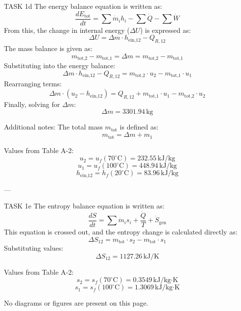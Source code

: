 TASK 1d  
The energy balance equation is written as:  
\[
\frac{dE_{\text{tot}}}{dt} = \sum \dot{m}_i h_i - \sum \dot{Q} - \sum \dot{W}
\]  
From this, the change in internal energy (\( \Delta U \)) is expressed as:  
\[
\Delta U = \Delta m \cdot h_{\text{ein,12}} - Q_{R,12}
\]  
The mass balance is given as:  
\[
m_{\text{tot,2}} - m_{\text{tot,1}} = \Delta m = m_{\text{tot,2}} - m_{\text{tot,1}}
\]  
Substituting into the energy balance:  
\[
\Delta m \cdot h_{\text{ein,12}} - Q_{R,12} = m_{\text{tot,2}} \cdot u_2 - m_{\text{tot,1}} \cdot u_1
\]  
Rearranging terms:  
\[
\Delta m \cdot (u_2 - h_{\text{ein,12}}) = Q_{R,12} + m_{\text{tot,1}} \cdot u_1 - m_{\text{tot,2}} \cdot u_2
\]  
Finally, solving for \( \Delta m \):  
\[
\Delta m = 3301.94 \, \text{kg}
\]  

Additional notes:  
The total mass \( m_{\text{tot}} \) is defined as:  
\[
m_{\text{tot}} = \Delta m + m_1
\]  

Values from Table A-2:  
\[
u_2 = u_f(70^\circ\text{C}) = 232.55 \, \text{kJ/kg}
\]  
\[
u_1 = u_f(100^\circ\text{C}) = 448.94 \, \text{kJ/kg}
\]  
\[
h_{\text{ein,12}} = h_f(20^\circ\text{C}) = 83.96 \, \text{kJ/kg}
\]  

---

TASK 1e  
The entropy balance equation is written as:  
\[
\frac{dS}{dt} = \sum \dot{m}_i s_i + \frac{\dot{Q}}{T} + \dot{S}_{\text{gen}}
\]  
This equation is crossed out, and the entropy change is calculated directly as:  
\[
\Delta S_{12} = m_{\text{tot}} \cdot s_2 - m_{\text{tot}} \cdot s_1
\]  
Substituting values:  
\[
\Delta S_{12} = 1127.26 \, \text{kJ/K}
\]  

Values from Table A-2:  
\[
s_2 = s_f(70^\circ\text{C}) = 0.3549 \, \text{kJ/kg·K}
\]  
\[
s_1 = s_f(100^\circ\text{C}) = 1.3069 \, \text{kJ/kg·K}
\]  

No diagrams or figures are present on this page.